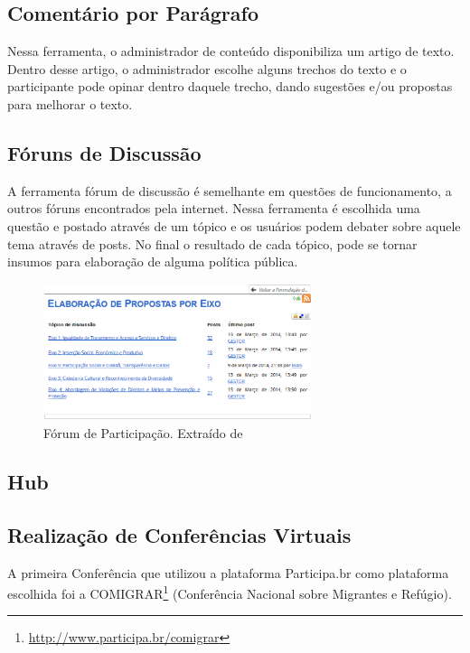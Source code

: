 \subsection{Comentário por Parágrafo}

Nessa ferramenta, o administrador de conteúdo disponibiliza um artigo de texto. Dentro desse artigo, o administrador escolhe alguns trechos do texto e o participante pode opinar dentro daquele trecho, dando sugestões e/ou propostas para melhorar o texto.


\subsection{Fóruns de Discussão}

A ferramenta fórum de discussão é semelhante em questões de funcionamento, a outros fóruns encontrados pela internet. Nessa ferramenta é escolhida uma questão e postado através de um tópico e os usuários podem debater sobre aquele tema através de posts. No final o resultado de cada tópico, pode se tornar insumos para elaboração de alguma política pública.

\graphicspath{{figuras/}}
\begin{figure}[H]
\centering
\includegraphics[width=0.7\textwidth]{foruns-participacao}
\caption{Fórum de Participação. Extraído de}
\label{fig:rails-architecture}
\end{figure}

\subsection{Hub}

\subsection{Realização de Conferências Virtuais}

A primeira Conferência que utilizou a plataforma Participa.br como plataforma escolhida foi a COMIGRAR\footnote{\url{http://www.participa.br/comigrar}} (Conferência Nacional sobre Migrantes e Refúgio).

